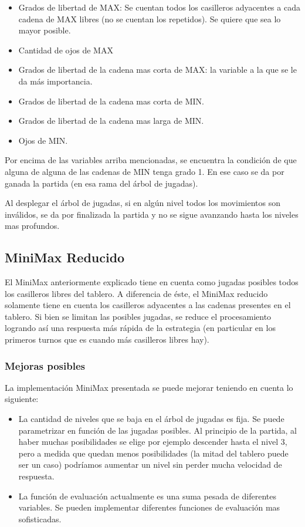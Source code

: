 \documentclass[11pt]{article}
\begin{document}
   \begin{itemize}
      \item Grados de libertad de MAX: Se cuentan todos los casilleros
        adyacentes a cada cadena de MAX libres (no se cuentan los
        repetidos). Se quiere que sea lo mayor posible.
      \item Cantidad de ojos de MAX
      \item Grados de libertad de la cadena mas corta de MAX: la
        variable a la que se le da m\'as importancia.
      \item Grados de libertad de la cadena mas corta de MIN.
      \item Grados de libertad de la cadena mas larga de MIN.
      \item Ojos de MIN.
   \end{itemize}
   
   Por encima de las variables arriba mencionadas, se encuentra la
   condici\'on de que alguna de alguna de las cadenas de MIN tenga
   grado 1. En ese caso se da por ganada la partida (en esa rama del
   \'arbol de jugadas).

   Al desplegar el \'arbol de jugadas, si en alg\'un nivel todos los
   movimientos son inv\'alidos, se da por finalizada la partida y no
   se sigue avanzando hasta los niveles mas profundos.

\subsection {MiniMax Reducido}
\label{sec-4.3.6}

El MiniMax anteriormente explicado tiene en cuenta como jugadas
posibles todos los casilleros libres del tablero.  A diferencia de
\'este, el MiniMax reducido solamente tiene en cuenta los casilleros
adyacentes a las cadenas presentes en el tablero.  Si bien se limitan
las posibles jugadas, se reduce el procesamiento logrando as\'i una
respuesta m\'as r\'apida de la estrategia (en particular en los
primeros turnos que es cuando m\'as casilleros libres hay). 

\subsubsection{Mejoras posibles}

   La implementaci\'on MiniMax presentada se puede mejorar teniendo en
   cuenta lo siguiente:

   \begin{itemize}
     \item La cantidad de niveles que se baja en el \'arbol de jugadas
       es fija. Se puede parametrizar en funci\'on de las jugadas
       posibles. Al principio de la partida, al haber muchas
       posibilidades se elige por ejemplo descender hasta el nivel 3,
       pero a medida que quedan menos posibilidades (la mitad del
       tablero puede ser un caso) podr\'iamos aumentar un nivel sin
       perder mucha velocidad de respuesta.
     \item La funci\'on de evaluaci\'on actualmente es una suma pesada
       de diferentes variables. Se pueden implementar diferentes
       funciones de evaluaci\'on mas sofisticadas.
   \end{itemize}
\end{document}
